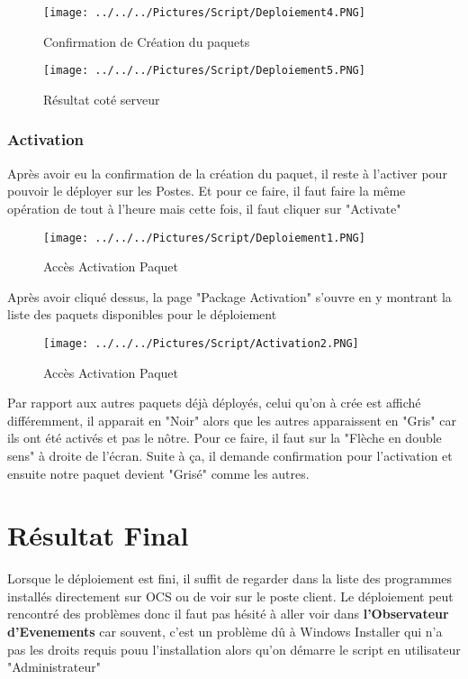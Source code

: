 \documentclass[11pt,a4paper,oneside]{article}
\begin{document}
\begin{figure}[hbtp]
\centering
\texttt{[image: ../../../Pictures/Script/Deploiement4.PNG]}
\caption{Confirmation de Création du paquets}
\end{figure}

\begin{figure}[hbtp]
\centering
\texttt{[image: ../../../Pictures/Script/Deploiement5.PNG]}
\caption{Résultat coté serveur}
\end{figure}
\newpage
\subsubsection{Activation}

Après avoir eu la confirmation de la création du paquet, il reste à l'activer pour pouvoir le déployer sur les Postes. Et pour ce faire, il faut faire la même opération de tout à l'heure mais cette fois, il faut cliquer sur "Activate"

\begin{figure}[hbtp]
\centering
\texttt{[image: ../../../Pictures/Script/Deploiement1.PNG]}
\caption{Accès Activation Paquet}
\end{figure}

Après avoir cliqué dessus, la page "Package Activation" s'ouvre en y montrant la liste des paquets disponibles pour le déploiement

\begin{figure}[hbtp]
\centering
\texttt{[image: ../../../Pictures/Script/Activation2.PNG]}
\caption{Accès Activation Paquet}
\end{figure}
 
Par rapport aux autres paquets déjà déployés, celui qu'on à crée est affiché différemment, il apparait en "Noir" alors que les autres apparaissent en "Gris" car ils ont été activés et pas le nôtre. Pour ce faire, il faut sur la "Flèche en double sens" à droite de l'écran. Suite à ça, il demande confirmation pour l'activation et ensuite notre paquet devient "Grisé" comme les autres.
\newpage

\section{Résultat Final}
Lorsque le déploiement est fini, il suffit de regarder dans la liste des programmes installés directement sur OCS ou de voir sur le poste client. Le déploiement peut rencontré des problèmes donc il faut pas hésité à aller voir dans \textbf{l'Observateur d'Evenements} car souvent, c'est un problème dû à Windows Installer qui n'a pas les droits requis pouu l'installation alors qu'on démarre le script en utilisateur "Administrateur"
\end{document}
